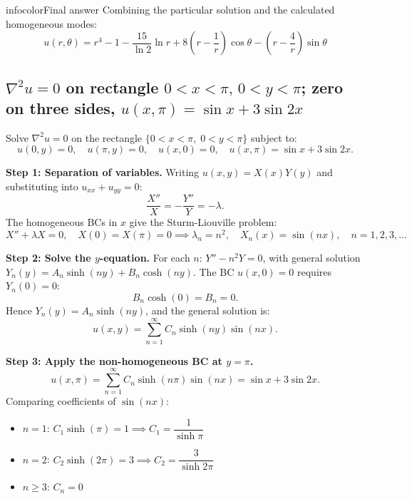 \documentclass[a4paper,11pt]{article} %
\newenvironment{summarybox}[1][]{\begin{custombox}[#1]{infocolor}{Final answer}}{\end{custombox}}
\begin{document}
\begin{summarybox}[title={Final Solution}]
Combining the particular solution and the calculated homogeneous modes:
$$ u(r, \theta) = r^4 - 1 - \frac{15}{\ln 2} \ln r + 8\left(r - \frac{1}{r}\right) \cos\theta - \left(r - \frac{4}{r}\right) \sin\theta $$
\end{summarybox}

\newpage
\subsection{\texorpdfstring{$\nabla^2 u=0$ on rectangle $0<x<\pi,\,0<y<\pi$; zero on three sides, $u(x,\pi)=\sin x+3\sin 2x$}{Laplace on rectangle: eigenfunction expansion in $x$; sinh solution in $y$ satisfying zero bottom BC}}

\begin{problembox}
Solve $\nabla^2 u = 0$ on the rectangle $\{0 < x < \pi,\; 0 < y < \pi\}$ subject to:
$$u(0,y) = 0, \quad u(\pi,y) = 0, \quad u(x,0) = 0, \quad u(x,\pi) = \sin x + 3\sin 2x.$$
\end{problembox}

\textbf{Step 1: Separation of variables.}
Writing $u(x,y) = X(x)Y(y)$ and substituting into $u_{xx} + u_{yy} = 0$:
\[
    \frac{X''}{X} = -\frac{Y''}{Y} = -\lambda.
\]
The homogeneous BCs in $x$ give the Sturm-Liouville problem:
\[
    X'' + \lambda X = 0, \quad X(0) = X(\pi) = 0
    \implies \lambda_n = n^2, \quad X_n(x) = \sin(nx), \quad n = 1,2,3,\dots
\]

\textbf{Step 2: Solve the $y$-equation.}
For each $n$: $Y'' - n^2 Y = 0$, with general solution $Y_n(y) = A_n \sinh(ny) + B_n \cosh(ny)$.
The BC $u(x,0)=0$ requires $Y_n(0) = 0$:
\[
    B_n \cosh(0) = B_n = 0.
\]
Hence $Y_n(y) = A_n \sinh(ny)$, and the general solution is:
\[
    u(x,y) = \sum_{n=1}^{\infty} C_n \sinh(ny)\sin(nx).
\]

\textbf{Step 3: Apply the non-homogeneous BC at $y = \pi$.}
\[
    u(x,\pi) = \sum_{n=1}^{\infty} C_n \sinh(n\pi)\sin(nx) = \sin x + 3\sin 2x.
\]
Comparing coefficients of $\sin(nx)$:
\begin{itemize}
    \item $n=1$: $C_1 \sinh(\pi) = 1 \implies C_1 = \dfrac{1}{\sinh\pi}$
    \item $n=2$: $C_2 \sinh(2\pi) = 3 \implies C_2 = \dfrac{3}{\sinh 2\pi}$
    \item $n \ge 3$: $C_n = 0$
\end{itemize}
\end{document}
